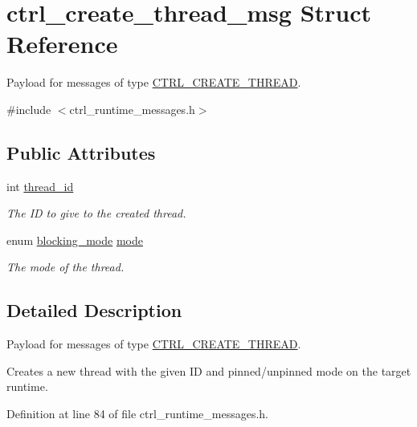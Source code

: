\hypertarget{structctrl__create__thread__msg}{\section{ctrl\-\_\-create\-\_\-thread\-\_\-msg Struct Reference}
\label{structctrl__create__thread__msg}
}


Payload for messages of type \hyperlink{ctrl__runtime__messages_8h_aff250b7918a6975b13277c84bc6ec5b9a2e623fd9e79d281a3137762f1d5569fe}{C\-T\-R\-L\-\_\-\-C\-R\-E\-A\-T\-E\-\_\-\-T\-H\-R\-E\-A\-D}.  




{\ttfamily \#include $<$ctrl\-\_\-runtime\-\_\-messages.\-h$>$}

\subsection*{Public Attributes}
\begin{DoxyCompactItemize}
\item 
int \hyperlink{structctrl__create__thread__msg_a930a1b6ad3d62f876fa6ce4a44f2daf1}{thread\-\_\-id}
\begin{DoxyCompactList}\small\item\em The I\-D to give to the created thread. \end{DoxyCompactList}\item 
enum \hyperlink{dfg_8h_af31ca3002c5b769551da6f1183bafed5}{blocking\-\_\-mode} \hyperlink{structctrl__create__thread__msg_af74075761b9c8f46b619d33d4ef21c81}{mode}
\begin{DoxyCompactList}\small\item\em The mode of the thread. \end{DoxyCompactList}\end{DoxyCompactItemize}


\subsection{Detailed Description}
Payload for messages of type \hyperlink{ctrl__runtime__messages_8h_aff250b7918a6975b13277c84bc6ec5b9a2e623fd9e79d281a3137762f1d5569fe}{C\-T\-R\-L\-\_\-\-C\-R\-E\-A\-T\-E\-\_\-\-T\-H\-R\-E\-A\-D}. 

Creates a new thread with the given I\-D and pinned/unpinned mode on the target runtime. 

Definition at line 84 of file ctrl\-\_\-runtime\-\_\-messages.\-h.



